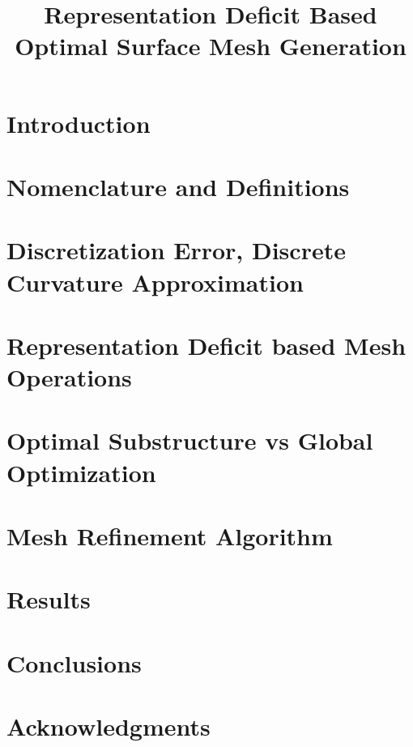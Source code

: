 \documentclass[11pt]{article}
\begin{document}
\title{Representation Deficit Based Optimal Surface Mesh Generation}
\maketitle

\section{Introduction}


\section{Nomenclature and Definitions}


\section{Discretization Error, Discrete Curvature Approximation}


\section{Representation Deficit based Mesh Operations}


\section{Optimal Substructure vs Global Optimization}


\section{Mesh Refinement Algorithm}


\section{Results}

\section{Conclusions}

\section{Acknowledgments}




\end{document}
